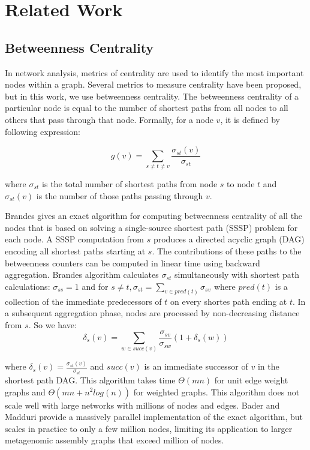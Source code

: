 \documentclass[runningheads,a4paper]{llncs}
\begin{document}
\section{Related Work}

\subsection*{Betweenness Centrality}
In network analysis, metrics of centrality are used to identify the most important nodes within a graph. Several metrics to measure centrality have been proposed, but in this work, we use betweenness centrality. The betweenness centrality of a particular node is equal to the number of shortest paths from all nodes to all others that pass through that node. Formally, for a node $v$, it is defined by following expression:

$$g(v) = \sum_{s \neq t \neq v} \frac{\sigma_{st}(v)}{\sigma_{st}}$$

where $\sigma_{st}$ is the total number of shortest paths from node $s$ to node $t$ and $\sigma_{st}(v)$ is the number of those paths passing through $v$.

Brandes\cite{brandes} gives an exact algorithm for computing betweenness centrality of all the nodes that is based on solving a single-source shortest path (SSSP) problem for each node. A SSSP computation from $s$ produces a directed acyclic graph (DAG) encoding all shortest paths starting at $s$. The contributions of these paths to the betweenness counters can be computed in linear time using backward aggregation. Brandes algorithm calculates $\sigma_{st}$  simultaneously with shortest path calculations: $\sigma_{ss} = 1$ and for $s \neq t, \sigma_{st} = \sum_{v \in pred(t)} \sigma_{sv}$ where $pred(t)$ is a collection of the immediate predecessors of  $t$ on every shortes path ending at $t$. In a subsequent aggregation phase, nodes are processed by non-decreasing distance from $s$. So we have: 
$$\delta_{s}(v) = \sum_{w \in succ(v)} \frac{\sigma_{sv}}{\sigma_{sw}}(1+\delta_{s}(w))$$

where $\delta_{s}(v) = \frac{\sigma_{st}(v)}{\sigma_{st}}$ and $succ(v)$ is an immediate successor of $v$  in the shortest path DAG.   
This algorithm takes time $\Theta(mn)$ for unit edge weight graphs and $\Theta(mn + n^{2}log(n))$ for weighted graphs. This algorithm does not scale well with large networks with millions of nodes and edges. Bader and Madduri\cite{bader} provide a massively parallel implementation of the exact algorithm, but scales in practice to only a few million nodes, limiting its application to larger metagenomic assembly graphs that exceed million of nodes.
\end{document}

